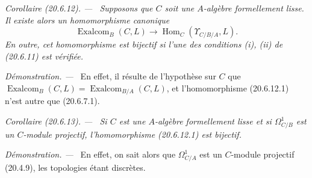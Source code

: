 \documentclass[10pt,oneside]{book}
\makeatletter
\newcommand{\setmanualcurrentlabel}[1]{\def\@currentlabel{#1}}
\newenvironment{corollary}[1][]{%
  \setmanualcurrentlabel{#1}\par\medskip\noindent\itshape Corollaire (#1). ---\ }{\par}
\newenvironment{proof}{%
  \par\medskip\noindent\textit{Démonstration. ---\ }}{\par}
\makeatother
\begin{document}
\begin{corollary}[20.6.12]
\label{0.20.6.12-fr}
Supposons que $C$ soit une $A$-algèbre formellement lisse. Il existe alors
un homomorphisme canonique
\begin{equation}
\tag{20.6.12.1}
\label{0.20.6.12.1-fr}
  \operatorname{Exalcom}_B(C,L)\longrightarrow
  \operatorname{Hom}_C(\Upsilon_{C/B/A},L).
\end{equation}
En outre, cet homomorphisme est bijectif si l'une des conditions (i),
(ii) de (20.6.11) est vérifiée.
\end{corollary}

\begin{proof}
En effet, il résulte de l'hypothèse sur $C$ que
$\operatorname{Exalcom}_B(C,L)=\operatorname{Exalcom}_{B/A}(C,L)$, et
l'homomorphisme (20.6.12.1) n'est autre que (20.6.7.1).
\end{proof}

\begin{corollary}[20.6.13]
\label{0.20.6.13-fr}
Si $C$ est une $A$-algèbre formellement lisse et si $\Omega^1_{C/B}$ est
un $C$-module projectif, l'homomorphisme (20.6.12.1) est bijectif.
\end{corollary}

\begin{proof}
En effet, on sait alors que $\Omega^1_{C/A}$ est un $C$-module projectif
(20.4.9), les topologies étant discrètes.
\end{proof}
\end{document}
